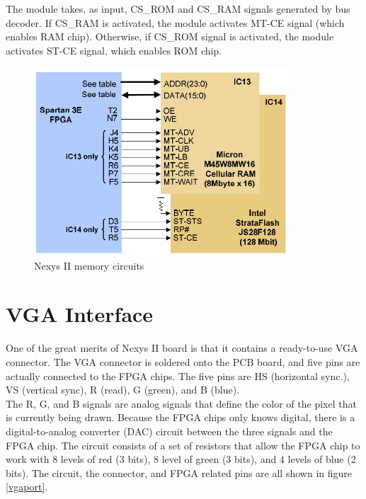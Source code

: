 \documentclass[oneside]{book}
\begin{document}
The module takes, as input, CS\_ROM and CS\_RAM signals generated by
bus decoder. If CS\_RAM is activated, the module activates MT-CE
signal (which enables RAM chip). Otherwise, if CS\_ROM signal is
activated, the module activates ST-CE signal, which enables ROM chip.

\begin{figure}[H]
\begin{center}
\includegraphics[width=0.85\textwidth]{memory.png}
\end{center}
\caption{Nexys II memory circuits}
\label{memory}
\end{figure}

\section {VGA Interface}

One of the great merits of Nexys II board is that it contains a ready-to-use
VGA connector. The VGA connector is soldered onto the PCB board, and five
pins are actually connected to the FPGA chips. The five pins are HS
(horizontal sync.), VS (vertical sync), R (read), G (green), and B (blue).\\

The R, G, and B signals are analog signals that define the color of
the pixel that is currently being drawn. Because the FPGA chips only
knows digital, there is a digital-to-analog converter (DAC) circuit between
the three signals and the FPGA chip. The circuit consists of a set of
resistors that allow the FPGA chip to work with 8 levels of red (3 bits),
8 level of green (3 bits), and 4 levels of blue (2 bits). The circuit,
the connector, and FPGA related pins are all shown in figure \ref{vgaport}.\\
\end{document}
